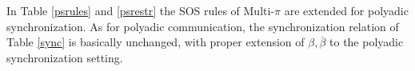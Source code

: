 \documentclass[submission,copyright,creativecommons]{eptcs}
\begin{document}
In Table \ref{psrules} and \ref{psrestr} the SOS rules of Multi-$\pi$ are extended for polyadic synchronization. As for polyadic communication, the synchronization relation of Table \ref{sync} is basically unchanged, with proper extension of $\beta, \overline{\beta}$ to the polyadic synchronization setting.
\end{document}
